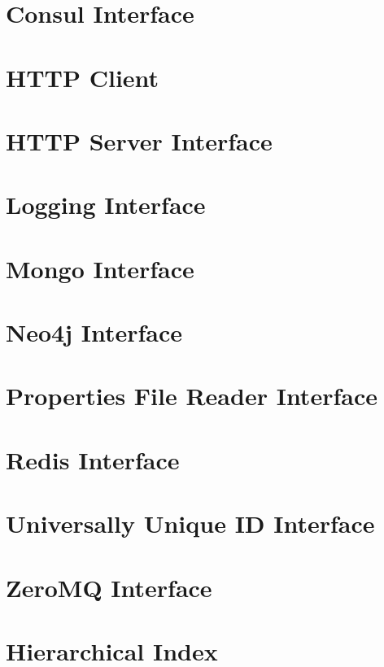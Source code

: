 \documentclass[twoside]{book}
\newcommand{\+}{\discretionary{\mbox{\scriptsize$\hookleftarrow$}}{}{}}
\begin{document}
\chapter{Consul Interface}
\label{consul}
\hypertarget{consul}{}

\chapter{H\+T\+TP Client}
\label{http_client}
\hypertarget{http_client}{}

\chapter{H\+T\+TP Server Interface}
\label{http_server}
\hypertarget{http_server}{}

\chapter{Logging Interface}
\label{logging}
\hypertarget{logging}{}

\chapter{Mongo Interface}
\label{mongo}
\hypertarget{mongo}{}

\chapter{Neo4j Interface}
\label{neo4j}
\hypertarget{neo4j}{}

\chapter{Properties File Reader Interface}
\label{props}
\hypertarget{props}{}

\chapter{Redis Interface}
\label{redis}
\hypertarget{redis}{}

\chapter{Universally Unique ID Interface}
\label{uuid}
\hypertarget{uuid}{}

\chapter{Zero\+MQ Interface}
\label{zeromq}
\hypertarget{zeromq}{}

\chapter{Hierarchical Index}

\end{document}
